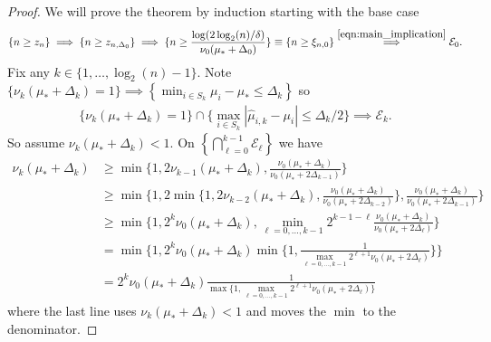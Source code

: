 \begin{proof}
We will prove the theorem by induction
starting with the base case
\begin{align*}
\{n \geq z_n\} \implies \{ n \geq z_{n,\Delta_0} \} \implies \{ n \geq \frac{\log(2 \log_2(n)/\delta)}{ \nu_0(\mu_* + \Delta_0)} \} \equiv \{n \geq \xi_{n,0}\} \overset{\eqref{eqn:main_implication}}{\implies} \mathcal{E}_0.
\end{align*} 
Fix any $k \in \{1,\dots,\log_2(n)-1\}$. 
Note $\{\nu_k(\mu_*+\Delta_k)=1 \} \implies \left\{ \min_{i \in S_k} \mu_i-\mu_* \leq \Delta_k \right\}$ so
\begin{align*}
\{\nu_k(\mu_*+\Delta_k)=1 \} \cap \{ \max_{i\in S_k} |\widehat{\mu}_{i,k} - \mu_i| \leq \Delta_k/2 \} \implies \mathcal{E}_k.
\end{align*} 
So assume $\nu_k(\mu_*+\Delta_k)<1$.
On $\left\{ \bigcap_{\ell=0}^{k-1} \mathcal{E}_\ell \right\}$ we have 
\begin{align*}
\nu_{k}(\mu_*+\Delta_k) &\geq \min\{ 1, 2 \nu_{k-1}(\mu_*+\Delta_k) , \tfrac{\nu_0(\mu_*+\Delta_k) }{\nu_0(\mu_* + 2\Delta_{k-1})} \} \\
&\geq \min\{ 1, 2 \min\{ 1, 2 \nu_{k-2}(\mu_*+\Delta_k) , \tfrac{\nu_0(\mu_*+\Delta_k) }{\nu_0(\mu_* + 2\Delta_{k-2})} \} , \tfrac{\nu_0(\mu_*+\Delta_k) }{\nu_0(\mu_* + 2\Delta_{k-1})} \} \\
&\geq \min\{ 1,2^{k} \nu_0(\mu_* + \Delta_k), \min_{\ell=0,\dots,k-1} 2^{k-1-\ell} \tfrac{\nu_0(\mu_*+\Delta_k)}{\nu_0(\mu_* + 2\Delta_{\ell})} \} \\
&= \min\{ 1,2^{k} \nu_0(\mu_* + \Delta_k) \min\{ 1,   \tfrac{1}{\max_{\ell=0,\dots,k-1} 2^{\ell+1} \nu_0(\mu_* + 2\Delta_{\ell})} \} \}\\
&= 2^{k} \nu_0(\mu_* + \Delta_k) \tfrac{1}{\max\{ 1, \max_{\ell=0,\dots,k-1} 2^{\ell+1} \nu_0(\mu_* + 2\Delta_{\ell}) \}} 
\end{align*}
where the last line uses $\nu_k(\mu_*+\Delta_k)<1$ and moves the $\min$ to the denominator.

\end{proof}

